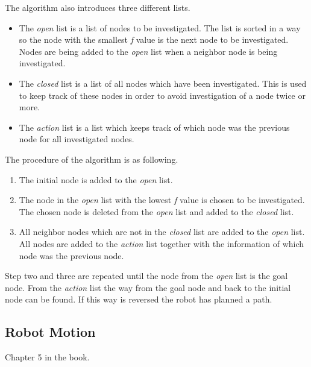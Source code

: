 The algorithm also introduces three different lists.

\begin{itemize}
	\item The \emph{open} list is a list of nodes to be investigated. The list is sorted in a way so the node with the smallest \emph{f} value is the next node to be investigated. Nodes are being added to the \emph{open} list when a neighbor node is being investigated.

	\item The \emph{closed} list is a list of all nodes which have been investigated. This is used to keep track of these nodes in order to avoid investigation of a node twice or more.

	\item The \emph{action} list is a list which keeps track of which node was the previous node for all investigated nodes.\\
\end{itemize}

The procedure of the algorithm is as following. 

\begin{enumerate}
  \item The initial node is added to the \emph{open} list.

  \item The node in the \emph{open} list with the lowest \emph{f} value is chosen to be investigated. The chosen node is deleted from the \emph{open} list and added to the \emph{closed} list. 

  \item All neighbor nodes which are not in the \emph{closed} list are added to the \emph{open} list. All nodes are added to the \emph{action} list together with the information of which node was the previous node.
\end{enumerate}

Step two and three are repeated until the node from the \emph{open} list is the goal node. From the \emph{action} list the way from the goal node and back to the initial node can be found. If this way is reversed the robot has planned a path.


\subsection{Robot Motion} %
\label{sub:robot_motion}

Chapter 5 in the book.

